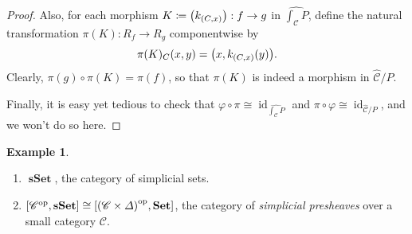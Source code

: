 \documentclass[10pt,letterpaper,cm]{nupset}
\theoremstyle{definition}
\newtheorem{exmp}[definition]{Example}
\theoremstyle{theorem}
\theoremstyle{remark}
\newcommand{\0}{\mathbf{0}}
\newcommand{\1}{\mathbf{1}}
\newcommand{\2}{\mathbf{2}}
\DeclareMathOperator{\op}{op}
\DeclareMathOperator{\sset}{\mathbf{sSet}}
\DeclareMathOperator{\set}{\mathbf{Set}}
\renewcommand{\c}{\mathscr{C}}
\DeclareMathOperator{\idd}{id}
\newcommand{\be}{\begin{enumerate}}
\newcommand{\ee}{\end{enumerate}}
\begin{document}
\begin{proof}
\smallskip

Also, for each morphism $K \coloneqq \mleft(k_{(C,x)}\mright) : f \to g$ in $ \widehat{\int_{\c}{P}}$, define the natural transformation \linebreak $\pi(K) : R_f \to R_g$ componentwise by  $$\pi(K)_C(x,y) = \mleft(x, k_{\mleft(C,x\mright)}(y)\mright).$$ Clearly, $\pi(g) \circ \pi(K) = \pi(f)$, so that $\pi(K)$ is indeed a morphism in $\widehat{\c}/P$.

\medskip

Finally, it is easy yet tedious to check that $\varphi \circ \pi \cong \idd_{ \widehat{\int_{\c}{P}} }$ and $\pi \circ \varphi \cong \idd_{ \widehat{\c}/P}$, and we won't do so here.
\end{proof}

\begin{exmp} $ $
\be
\item $\sset$, the category of simplicial sets.
\item $\mleft[\c^{\op}, \sset\mright] \cong \mleft[\mleft(\c \times \varDelta\mright)^{\op}, \set\mright]$, the category of \textit{simplicial presheaves} over a small category $\c$.
\ee
\end{exmp}

\printbibliography[
heading=bibintoc,
title={References}
]
\end{document}
